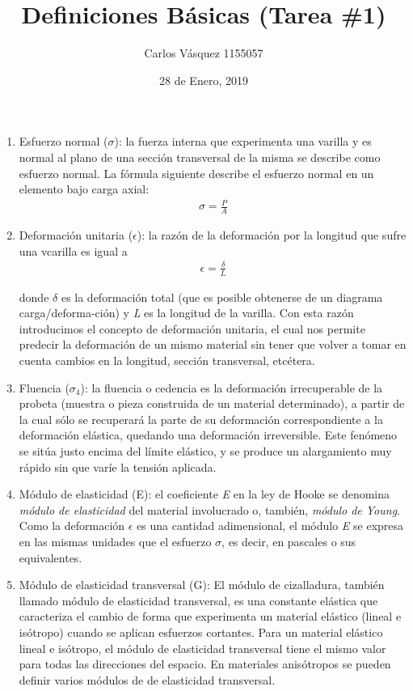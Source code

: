 \documentclass[12pt, letterpaper]{article}
\title{Definiciones Básicas (Tarea \#1)}
\author{Carlos Vásquez 1155057}
\date{28 de Enero, 2019}
\begin{document}
\maketitle
\begin{enumerate}
    \item Esfuerzo normal ($\sigma$): la fuerza interna que experimenta una varilla y es normal al plano de una sección transversal de la misma se describe como esfuerzo normal. La fórmula siguiente describe el esfuerzo normal en un elemento bajo carga axial\autocite{MM}:
    \begin{align}
        \sigma = \frac{P}{A}
    \end{align}
    
    \item Deformación unitaria ($\epsilon$): la razón de la deformación por la longitud que sufre una vcarilla es igual a
    \begin{align}
        \epsilon = \frac{\delta}{L}
    \end{align}
    
    donde $\delta$ es la deformación total (que es posible obtenerse de un diagrama carga/deforma-ción) y \emph{L} es la longitud de la varilla. Con esta razón introducimos el concepto de deformación unitaria, el cual nos permite predecir la deformación de un mismo material sin tener que volver a tomar en cuenta cambios en la longitud, sección transversal, etcétera.\autocite{MM}
    
    \item Fluencia ($\sigma_4$): la fluencia o cedencia es la deformación irrecuperable de la probeta (muestra o pieza construida de un material determinado), a partir de la cual sólo se recuperará la parte de su deformación correspondiente a la deformación elástica, quedando una deformación irreversible. Este fenómeno se sitúa justo encima del límite elástico, y se produce un alargamiento muy rápido sin que varíe la tensión aplicada.
    
    \item Módulo de elasticidad (E): el coeficiente \emph{E} en la ley de Hooke se denomina \emph{módulo de elasticidad} del material involucrado o, también, \emph{módulo de Young}. Como la deformación $\epsilon$ es una cantidad adimensional, el módulo \emph{E} se expresa en las mismas unidades que el esfuerzo $\sigma$, es decir, en pascales o sus equivalentes.\autocite{MM}
    
    \item Módulo de elasticidad transversal (G): El módulo de cizalladura, también llamado módulo de elasticidad transversal, es una constante elástica que caracteriza el cambio de forma que experimenta un material elástico (lineal e isótropo) cuando se aplican esfuerzos cortantes. Para un material elástico lineal e isótropo, el módulo de elasticidad transversal tiene el mismo valor para todas las direcciones del espacio. En materiales anisótropos se pueden definir varios módulos de de elasticidad transversal.\autocite{EsAc}
    

\end{enumerate}
\end{document}
